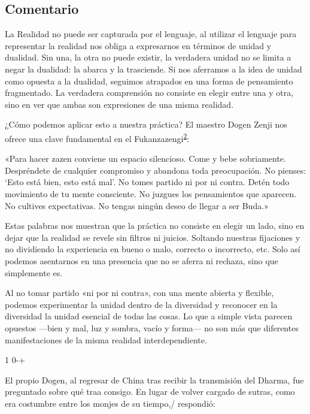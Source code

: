 \documentclass[
  a5paperpaper,
]{article}
\begin{document}
\hfill\break

\hypertarget{comentario-22}{%
\subsection{Comentario}\label{comentario-22}}

La Realidad no puede ser capturada por el lenguaje, al utilizar el
lenguaje para representar la realidad nos obliga a expresarnos en
términos de unidad y dualidad. Sin una, la otra no puede existir, la
verdadera unidad no se limita a negar la dualidad: la abarca y la
trasciende. Si nos aferramos a la idea de unidad como opuesta a la
dualidad, seguimos atrapados en una forma de pensamiento fragmentado. La
verdadera comprensión no consiste en elegir entre una y otra, sino en
ver que ambas son expresiones de una misma realidad.

¿Cómo podemos aplicar esto a nuestra práctica? El maestro Dogen Zenji
nos ofrece una clave fundamental en el
Fukanzazengi\textsuperscript{\protect\hypertarget{ref2}{\protect\hyperlink{nota2}{2}}}:

«Para hacer zazen conviene un espacio silencioso. Come y bebe
sobriamente. Despréndete de cualquier compromiso y abandona toda
preocupación. No pienses: `Esto está bien, esto está mal'. No tomes
partido ni por ni contra. Detén todo movimiento de tu mente consciente.
No juzgues los pensamientos que aparecen. No cultives expectativas. No
tengas ningún deseo de llegar a ser Buda.»

Estas palabras nos muestran que la práctica no consiste en elegir un
lado, sino en dejar que la realidad se revele sin filtros ni juicios.
Soltando nuestras fijaciones y no dividiendo la experiencia en bueno o
malo, correcto o incorrecto, etc. Solo así podemos asentarnos en una
presencia que no se aferra ni rechaza, sino que simplemente es.

Al no tomar partido «ni por ni contra», con una mente abierta y
flexible, podemos experimentar la unidad dentro de la diversidad y
reconocer en la diversidad la unidad esencial de todas las cosas. Lo que
a simple vista parecen opuestos ---bien y mal, luz y sombra, vacío y
forma--- no son más que diferentes manifestaciones de la misma realidad
interdependiente.

1 0-+

El propio Dogen, al regresar de China tras recibir la transmisión del
Dharma, fue preguntado sobre qué traa consigo. En lugar de volver
cargado de sutras, como era costumbre entre los monjes de su tiempo,/
respondió:
\end{document}
